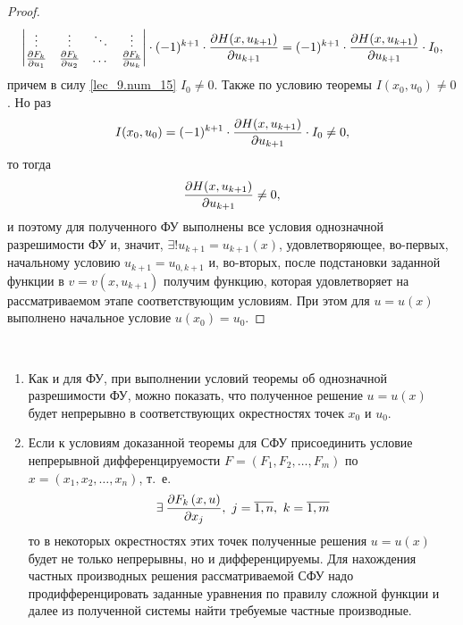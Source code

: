 \documentclass[../../main.tex]{subfiles}
\begin{document}
\begin{proof}
\begin{gather*}
\begin{vmatrix}
     \vdots & \vdots & \ddots & \vdots \\
     \frac{\partial F_{k}}{\partial u_1} & \frac{\partial F_{k}}{\partial u_2} & \dots & \frac{\partial F_{k}}{\partial u_k} \\
    \end{vmatrix} \cdot (-1)^{k+1} \cdot \frac{\partial H(x, u_{k+1})}{\partial u_{k+1}} = (-1)^{k+1} \cdot \frac{\partial H(x, u_{k+1})}{\partial u_{k+1}} \cdot I_0,
    \end{gather*}
    причем в силу \eqref{lec_9.num_15} $I_0 \ne 0$. Также по условию теоремы $I(x_0, u_0) \ne 0$. Но раз \[I(x_0, u_0) = (-1)^{k+1} \cdot \frac{\partial H(x, u_{k+1})}{\partial u_{k+1}} \cdot I_0 \ne 0,\]
    то тогда \[\frac{\partial H(x, u_{k+1})}{\partial u_{k+1}} \ne 0,\]
    и поэтому для полученного ФУ выполнены все условия 
    однозначной разрешимости ФУ и, значит, 
    $\exists! u_{k+1} = u_{k+1}\left(x\right)$, 
    удовлетворяющее, во-первых, начальному условию
    $u_{k+1} = u_{0,k+1}$ и, во-вторых, после подстановки
    заданной функции в
    $v = v\left(x, u_{k+1}\right)$ получим функцию,
    которая удовлетворяет на рассматриваемом этапе
    соответствующим условиям.
    При этом для $u = u\left(x\right)$ выполнено начальное
    условие $u\left(x_0\right) = u_0$.
\end{proof}

\begin{rems}

~

    \begin{enumerate}
        \item Как и для ФУ, при выполнении условий 
        теоремы об однозначной разрешимости ФУ, можно показать,
        что полученное решение $u = u\left(x\right)$
        будет непрерывно в соответствующих окрестностях
        точек $x_0$ и $u_0$.
        \item Если к условиям доказанной теоремы для
        СФУ присоединить условие непрерывной 
        дифференцируемости
        $F = \left(F_1, F_2, \dots, F_m\right)$ по
        $x = \left(x_1, x_2, \dots, x_n\right)$, т.~е. 
        \[\exists\:
        \pderiv{F_k\left(x, u\right)}{x_j},\ 
        j = \overline{1, n},\ k = \overline{1, m}\] то в некоторых окрестностях
        этих точек полученные решения 
        $u = u\left(x\right)$ будет не только 
        непрерывны, но и дифференцируемы.
        Для нахождения частных производных решения
        рассматриваемой СФУ надо продифференцировать
        заданные уравнения по правилу сложной функции и
        далее из полученной системы найти требуемые частные производные. 
    \end{enumerate}
\end{rems}
\end{document}
